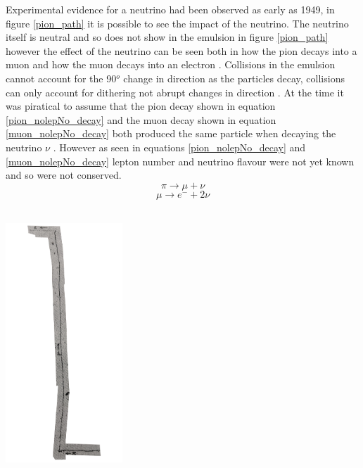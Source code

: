 \documentclass[12pt,a4paper]{article}
\newenvironment{Figure}
  {\par\medskip\noindent\minipage{\linewidth}}
  {\endminipage\par\medskip}
\begin{document}
Experimental evidence for a neutrino had been observed as early as 1949, in figure \ref{pion_path} it is possible to see the impact of the neutrino. The neutrino itself is neutral and so does not show in the emulsion in figure \ref{pion_path} however the effect of the neutrino can be seen both in how the pion decays into a muon and how the muon decays into an electron \cite{griffiths2008introduction}. Collisions in the emulsion cannot account for the 90$^o$ change in direction as the particles decay, collisions can only account for dithering not abrupt changes in direction \cite{griffiths2008introduction}. At the time it was piratical to assume that the pion decay shown in equation \ref{pion_nolepNo_decay} and the muon decay shown in equation \ref{muon_nolepNo_decay} both produced the same particle when decaying the neutrino $\nu$ \cite{griffiths2008introduction}. However as seen in equations \ref{pion_nolepNo_decay} and \ref{muon_nolepNo_decay} lepton number and neutrino flavour were not yet known and so were not conserved.
\begin{equation}
    \pi \rightarrow \mu + \nu
    \label{pion_nolepNo_decay}
\end{equation}
\begin{equation}
    \mu \rightarrow e^- + 2\nu
    \label{muon_nolepNo_decay}
\end{equation}
\\
\begin{Figure}
 \centering
 \includegraphics[height=90mm]{less_detailed_proper_path.png}
 \label{pion_path}
\end{Figure}
\end{document}

